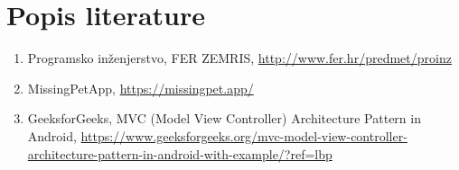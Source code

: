 \chapter*{Popis literature}
	 	
		
		
		\begin{enumerate}
			
			
			\item  Programsko inženjerstvo, FER ZEMRIS, \url{http://www.fer.hr/predmet/proinz}
			
			\item  MissingPetApp, \url{https://missingpet.app/}

			\item  GeeksforGeeks, MVC (Model View Controller) Architecture Pattern in Android, \url{https://www.geeksforgeeks.org/mvc-model-view-controller-architecture-pattern-in-android-with-example/?ref=lbp}
			
		\end{enumerate}
		
		 